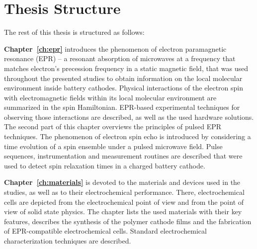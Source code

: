 \section{Thesis Structure}

The rest of this thesis is structured as follows:\\ 
\par
\textbf{Chapter~\ref{ch:epr}} introduces the phenomenon of electron paramagnetic resonance (EPR) -- a resonant absorption of microwaves at a frequency that matches electron's precession frequency in a static magnetic field, that was used throughout the presented studies to obtain information on the local molecular environment inside battery cathodes. Physical interactions of the electron spin with electromagnetic fields within its local molecular environment are summarized in the spin Hamiltonian. EPR-based experimental techniques for observing those interactions are described, as well as the used hardware solutions. The second part of this chapter overviews the principles of pulsed EPR techniques. The phenomenon of electron spin echo is introduced by considering a time evolution of a spin ensemble under a pulsed microwave field. Pulse sequences, instrumentation and measurement routines are described that were used to detect spin relaxation times in a charged battery cathode.\\

\par
\textbf{Chapter~\ref{ch:materials}} is devoted to the materials and devices used in the studies, as well as to their electrochemical performance. There, electrochemical cells are depicted from the electrochemical point of view and from the point of view of solid state physics. The chapter lists the used materials with their key features, describes the synthesis of the polymer cathode films and the fabrication of EPR-compatible electrochemical cells. Standard electrochemical characterization techniques are described.\\

